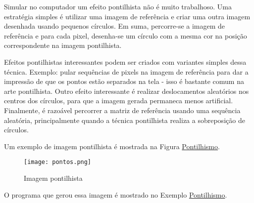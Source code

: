 \documentclass[11pt]{amsbook}
\begin{document}
Simular no computador um efeito pontilhista não é muito
trabalhoso. Uma estratégia simples é utilizar uma imagem de referência
e criar uma outra imagem desenhada usando pequenos círculos. Em suma,
percorre-se a imagem de referência e para cada pixel, desenha-se um
círculo com a mesma cor na posição correspondente na imagem
pontilhista.


Efeitos pontilhistas interessantes podem ser criados com variantes
simples dessa técnica. Exemplo: pular sequências de pixels na imagem
de referência para dar a impressão de que os pontos estão separados na
tela - isso é bastante comum na arte pontilhista. Outro efeito
interessante é realizar deslocamentos aleatórios nos centros dos
círculos, para que a imagem gerada permaneca menos
artificial. Finalmente, é razoável percorrer a matriz de referência
usando uma sequência aleatória, principalmente quando a técnica
pontilhista realiza a sobreposição de círculos.


Um exemplo de imagem pontilhista é mostrada na Figura \hyperlink{fig-pontilhismo}{Pontilhismo}.


\begin{figure}[h]{}
\centering\texttt{[image: pontos.png]}
\caption{Imagem pontilhista}

\end{figure}

O programa que gerou essa imagem é mostrado no Exemplo \hyperlink{exa-pontilhismo}{Pontilhismo}.
\end{document}
